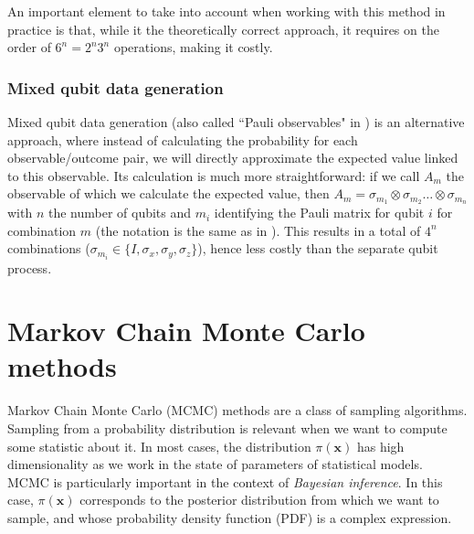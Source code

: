 \documentclass[12pt]{memoir}
\newcommand{\mb}{\mathbf}
\newcommand{\ti}{\textit}
\begin{document}
An important element to take into account when working with this method in practice is that, while it the theoretically correct approach, it requires on the order of $6^n = 2^n 3^n$ operations, making it costly.



\subsubsection*{Mixed qubit data generation}\label{section:mixed-qub-dg}

Mixed qubit data generation (also called ``Pauli observables" in \cite{Guta20}) is an alternative approach, where instead of calculating the probability for each observable/outcome pair, we will directly approximate the expected value linked to this observable. Its calculation is much more straightforward: if we call $A_m$ the observable of which we calculate the expected value, then $A_m = \sigma_{m_1} \otimes \sigma_{m_2} \dots \otimes \sigma_{m_n}$ with $n$ the number of qubits and $m_i$ identifying the Pauli matrix for qubit $i$ for combination $m$ (the notation is the same as in \cite{meth:bayesian:Langevin:ACMT2024}). This results in a total of $4^n$ combinations ($\sigma_{m_i} \in \{I, \sigma_x, \sigma_y, \sigma_z\}$), hence less costly than the separate qubit process.

\newpage

\section{Markov Chain Monte Carlo methods}
Markov Chain Monte Carlo (MCMC) methods are a class of sampling algorithms. Sampling from a probability distribution is relevant when we want to compute some statistic about it. In most cases, the distribution $\pi(\mb x)$ has high dimensionality as we work in the state of parameters of statistical models. MCMC is particularly important in the context of \ti{Bayesian inference}. In this case, $\pi(\mb x)$ corresponds to the posterior distribution from which we want to sample, and whose probability density function (PDF) is a complex expression. \medbreak
\end{document}
